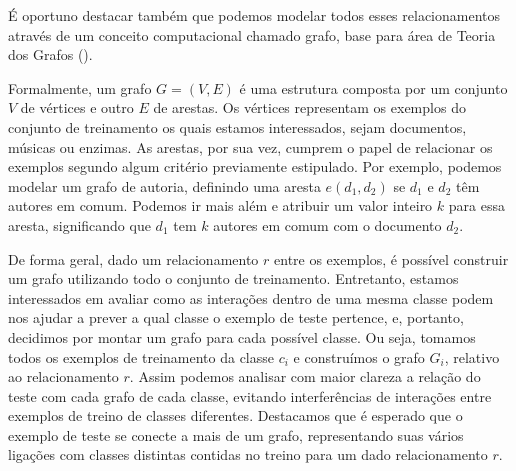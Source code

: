 
É oportuno destacar também que podemos modelar todos esses relacionamentos através de um conceito computacional chamado grafo, base para área de Teoria dos Grafos (\cite{Bondy08}).

Formalmente, um grafo $G = (V,E)$ é uma estrutura composta por um conjunto $V$ de vértices e outro $E$ de arestas. Os vértices representam os exemplos do conjunto de treinamento os quais estamos interessados, sejam documentos, músicas ou enzimas. As arestas, por sua vez, cumprem o papel de relacionar os exemplos segundo algum critério previamente estipulado. Por exemplo, podemos modelar um grafo de autoria, definindo uma aresta $e(d_1,d_2)$ se $d_1$ e $d_2$ têm autores em comum. Podemos ir mais além e atribuir um valor inteiro $k$ para essa aresta, significando que $d_1$ tem $k$ autores em comum com o documento $d_2$.

De forma geral, dado um  relacionamento $r$ entre os exemplos, é possível construir um grafo utilizando todo o conjunto de treinamento. Entretanto, estamos interessados em avaliar como as interações dentro de uma mesma classe podem nos ajudar a prever a qual classe o exemplo de teste pertence, e, portanto, decidimos por montar um grafo para cada possível classe.
Ou seja, tomamos todos os exemplos de treinamento da classe $c_i$ e construímos o grafo $G_i$, relativo ao relacionamento $r$. Assim podemos analisar com maior clareza a relação do teste com cada grafo de cada classe, evitando interferências de interações entre exemplos de treino de classes diferentes. Destacamos que é esperado que o exemplo de teste se conecte a mais de um grafo, representando suas vários ligações com classes distintas contidas no treino para um dado relacionamento $r$.


